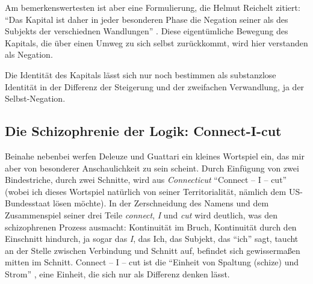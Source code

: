\documentclass[12pt,
               DIV13,
               paper=a4,
               twoside=false,
               onehalfspacing,
               bibliography=totoc,
               toc=graduated,
               draft,
               ]{scrartcl}
\newcommand{\pc}[2]{\parencite[#1]{#2}}
\newcommand{\zn}[3]{\parencite[#1, zit. nach][#2]{#3}}
\newcommand{\worries}[1]{\ifdraft{\textcolor{blue}{\texttt{(#1)}}}{}}
\begin{document}




Am bemerkenswertesten ist aber eine Formulierung, die Helmut Reichelt
zitiert: "`Das Kapital ist daher in jeder besonderen Phase die
Negation seiner als des Subjekts der verschiednen Wandlungen"'
\zn{Marx}{181}{reichelt}. Diese eigentümliche Bewegung des Kapitals,
die über einen Umweg zu sich selbst zurückkommt, wird hier verstanden
als Negation.

Die Identität des Kapitals lässt sich nur noch bestimmen als
substanzlose Identität in der Differenz der Steigerung und der
zweifachen Verwandlung, ja der Selbst-Negation. \worries{?}



\subsection{Die Schizophrenie der Logik: Connect-I-cut}

Beinahe nebenbei werfen Deleuze und Guattari ein kleines Wortspiel
ein, das mir aber von besonderer Anschaulichkeit zu sein scheint.
Durch Einfügung von zwei Bindestriche, durch zwei Schnitte, wird aus
\emph{Connecticut} "`Connect -- I -- cut"' \pc{48}{ao} (wobei ich
dieses Wortspiel natürlich von seiner Territorialität, nämlich dem
US-Bundesstaat lösen möchte). In der Zerschneidung des
Namens und dem Zusammenspiel seiner drei Teile \emph{connect},
\emph{I} und \emph{cut} wird deutlich, was den schizophrenen Prozess
ausmacht: Kontinuität im Bruch, Kontinuität durch den Einschnitt
hindurch, ja sogar das \emph{I}, das Ich, das Subjekt, das "`ich"'
sagt, taucht an der Stelle zwischen Verbindung und Schnitt auf,
befindet sich gewissermaßen mitten im Schnitt. Connect -- I -- cut ist
die "`Einheit von Spaltung (schize) und Strom"' \pc{296}{ao}, eine
Einheit, die sich nur als Differenz denken lässt.
\end{document}

